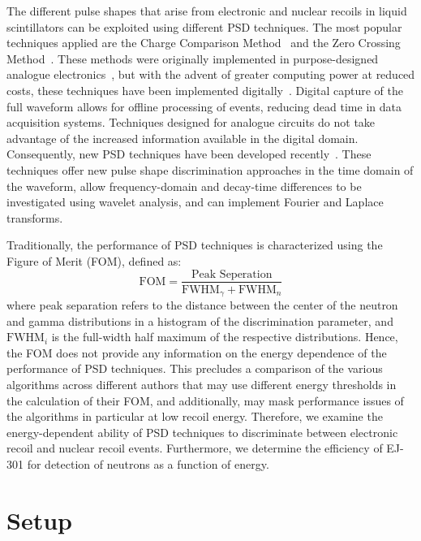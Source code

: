 The different pulse shapes that arise from electronic and nuclear recoils in liquid scintillators can be exploited using different PSD techniques. The most popular techniques applied are the Charge Comparison Method~\cite{Brooks:1959} and the Zero Crossing Method~\cite{Alexander:1961}. These methods were originally implemented in purpose-designed analogue electronics~\cite{Adams:1978}, but with the advent of greater computing power at reduced costs, these techniques have been implemented digitally~\cite{Kaschuck:2005, Cester:2014, Liao:2014}. Digital capture of the full waveform allows for offline processing of events, reducing dead time in data acquisition systems. Techniques designed for analogue circuits do not take advantage of the increased information available in the digital domain. Consequently, new PSD techniques have been developed recently~\cite{DMellow:2007, Gamage:2011, Yousefi:2009}. These techniques offer new pulse shape discrimination approaches in the time domain of the waveform, allow frequency-domain and decay-time differences to be investigated using wavelet analysis, and can implement Fourier and Laplace transforms.

Traditionally, the performance of PSD techniques is characterized using the Figure of Merit (FOM), defined as:
\begin{equation}\label{eq:FOM}
\text{FOM} = \frac{\text{Peak Seperation}}{\text{FWHM}_\gamma+\text{FWHM}_n}
\end{equation}
where peak separation refers to the distance between the center of the neutron and gamma distributions in a histogram of the discrimination parameter, and $\text{FWHM}_i$ is the full-width half maximum of the respective distributions. Hence, the FOM does not provide any information on the energy dependence of the performance of PSD techniques. This precludes a comparison of the various algorithms across different authors that may use different energy thresholds in the calculation of their FOM, and additionally, may mask performance issues of the algorithms in particular at low recoil energy. Therefore, we examine the energy-dependent ability of PSD techniques to discriminate between electronic recoil and nuclear recoil events. Furthermore, we determine the efficiency of EJ-301 for detection of neutrons as a function of energy.

\section{Setup}


